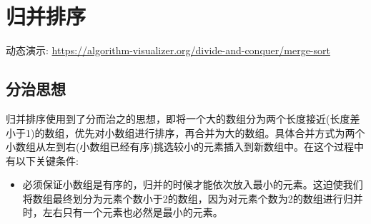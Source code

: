 \section{归并排序}

动态演示: \url{https://algorithm-visualizer.org/divide-and-conquer/merge-sort}

\subsection{分治思想}

归并排序使用到了分而治之的思想，即将一个大的数组分为两个长度接近(长度差小于1)的数组，优先对小数组进行排序，再合并为大的数组。具体合并方式为两个小数组从左到右(小数组已经有序)挑选较小的元素插入到新数组中。在这个过程中有以下关键条件:

\begin{itemize}
  \item 必须保证小数组是有序的，归并的时候才能依次放入最小的元素。这迫使我们将数组最终划分为元素个数小于2的数组，因为对元素个数为2的数组进行归并时，左右只有一个元素也必然是最小的元素。
\end{itemize}

